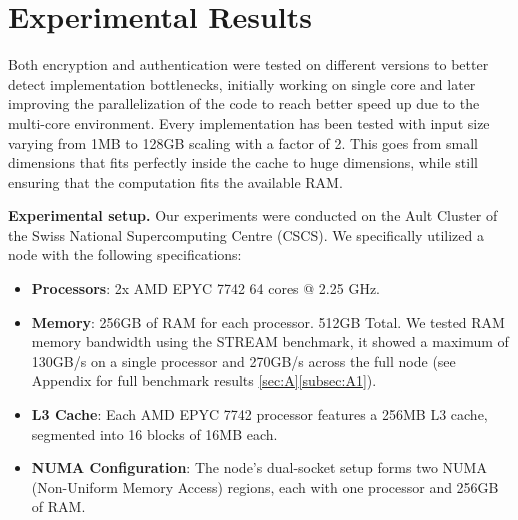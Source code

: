 \documentclass[letterpaper]{article}
\newcommand{\mypar}[1]{{\bf #1.}}
\begin{document}
\section{Experimental Results}\label{sec:exp}

Both encryption and authentication were tested on different versions to better detect implementation bottlenecks, initially working on single core and later improving the parallelization of the code to reach better speed up due to the multi-core environment.
Every implementation has been tested with input size varying from 1MB to 128GB scaling with a factor of 2. This goes from small dimensions that fits perfectly inside the cache to huge dimensions, while still ensuring that the computation fits the available RAM.

\mypar{Experimental setup}
Our experiments were conducted on the Ault Cluster of the Swiss National Supercomputing Centre (CSCS). We specifically utilized a node with the following specifications:\vspace{2pt}
\begin{itemize}
  \item \textbf{Processors}: 2x AMD EPYC 7742 64 cores @ 2.25 GHz.
  \item \textbf{Memory}: 256GB of RAM for each processor. 512GB Total. We tested RAM memory bandwidth using the STREAM benchmark\cite{stream}, it showed a maximum of 130GB/s on a single processor and 270GB/s across the full node (see Appendix for full benchmark results \ref{sec:A}\ref{subsec:A1}).
    \item \textbf{L3 Cache}: Each AMD EPYC 7742 processor features a 256MB L3 cache, segmented into 16 blocks of 16MB each.
    \item \textbf{NUMA Configuration}: The node's dual-socket setup forms two NUMA (Non-Uniform Memory Access) regions, each with one processor and 256GB of RAM.
\end{itemize}
\end{document}
